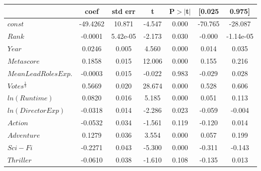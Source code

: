 \begin{table}[h]
\begin{center}
\begin{tabular}{lcccccc}
                                                    & \textbf{coef} & \textbf{std err} & \textbf{t} & \textbf{P$> |$t$|$} & \textbf{[0.025} & \textbf{0.975]}  \\
                    \midrule
                    \textbf{$const$}                &     -49.4262  &       10.871     &    -4.547  &         0.000        &      -70.765    &      -28.087     \\
                    \textbf{$Rank$}                 &      -0.0001  &     5.42e-05     &    -2.173  &         0.030        &       -0.000    &    -1.14e-05     \\
                    \textbf{$Year$}                 &       0.0246  &        0.005     &     4.560  &         0.000        &        0.014    &        0.035     \\
                    \textbf{$Metascore$}            &       0.1858  &        0.015     &    12.006  &         0.000        &        0.155    &        0.216     \\
                    \textbf{$Mean Lead Roles Exp.$} &      -0.0003  &        0.015     &    -0.022  &         0.983        &       -0.029    &        0.028     \\
                    \textbf{$Votes^{\frac{1}{3}}$}  &       0.5669  &        0.020     &    28.674  &         0.000        &        0.528    &        0.606     \\
                    \textbf{$ln(Runtime)$}          &       0.0820  &        0.016     &     5.185  &         0.000        &        0.051    &        0.113     \\
                    \textbf{$ln(Director Exp)$}     &      -0.0318  &        0.014     &    -2.286  &         0.023        &       -0.059    &       -0.004     \\
                    \textbf{$Action$}               &      -0.0532  &        0.034     &    -1.561  &         0.119        &       -0.120    &        0.014     \\
                    \textbf{$Adventure$}            &       0.1279  &        0.036     &     3.554  &         0.000        &        0.057    &        0.199     \\
                    \textbf{$Sci-Fi$}               &      -0.2271  &        0.043     &    -5.300  &         0.000        &       -0.311    &       -0.143     \\
                    \textbf{$Thriller$}             &      -0.0610  &        0.038     &    -1.610  &         0.108        &       -0.135    &        0.013     \\

\end{tabular}
\end{center}
\end{table}
